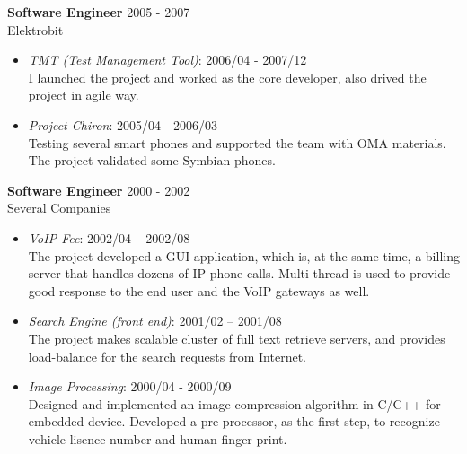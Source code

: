 \textbf{Software Engineer} \hfill 2005 - 2007 \\
        Elektrobit
        \begin{itemize}  \itemsep -2pt %
            \item {\em TMT (Test Management Tool)}: 2006/04 - 2007/12 \\ 
            I launched the project and worked as the core developer, also drived 
            the project in agile way.
            \item {\em Project Chiron}: 2005/04 - 2006/03 \\
                Testing several smart phones and supported the team with OMA materials.
                The project validated some Symbian phones.
        \end{itemize}
 
\textbf{Software Engineer} \hfill 2000 - 2002 \\
        Several Companies
        \begin{itemize}  \itemsep -2pt %
            \item {\em VoIP Fee}: 2002/04 – 2002/08 \\ 
            The project developed a GUI application, which is, at the same time, a billing server
            that handles dozens of IP phone calls.
            Multi-thread is used to provide good response to the end user and the VoIP gateways as well.
            \item {\em Search Engine (front end)}:  2001/02 -- 2001/08 \\
                The project makes scalable cluster of full text retrieve servers,
            and provides load-balance for the search requests from Internet. 
            \item {\em Image Processing}: 2000/04 - 2000/09\\
                Designed and implemented an image compression algorithm in C/C++ for embedded device.
                Developed a pre-processor, as the first step,
                to recognize vehicle lisence number and human finger-print.
        \end{itemize}
